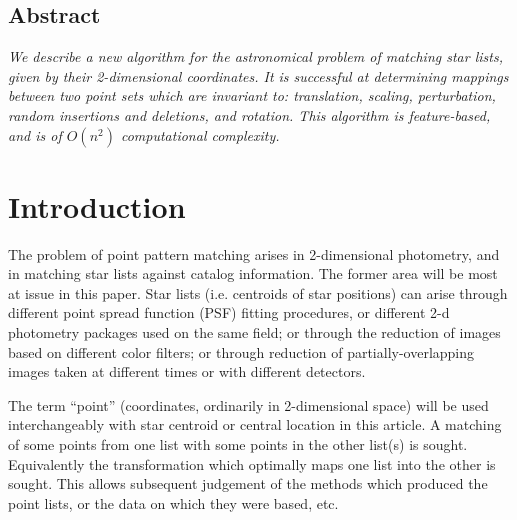 
\maketitle

\thispagestyle{empty}

\subsection*{\centering Abstract}
{\em
We describe a new algorithm for the astronomical problem of matching star 
lists, given by their 2-dimensional coordinates.  It is successful at 
determining mappings between two point sets which are invariant to:
translation, scaling, perturbation, random insertions and deletions, and 
rotation.  This algorithm is feature-based, and is of
$O(n^2)$ computational complexity.
}

\section{Introduction}


The problem of point pattern matching arises in 2-dimensional photometry,
and in matching star lists against catalog information.  The former area
will be most at issue in this paper.  Star lists (i.e. centroids of
star positions) can arise through different point spread function (PSF) 
fitting procedures, or 
different 2-d photometry packages used on the same field; or through 
the reduction of images based on different color filters; 
or through reduction of partially-overlapping images taken at different
times or with different detectors.

The term ``point'' (coordinates, ordinarily in 2-dimensional space) 
will be used 
interchangeably with star centroid or central location in this article.
A matching of some points from one list with some points in the 
other list(s) is sought.  Equivalently the transformation which optimally 
maps one list into the other is sought.  This allows subsequent judgement
of the methods which produced the point lists, or the data on which they
were based, etc.

